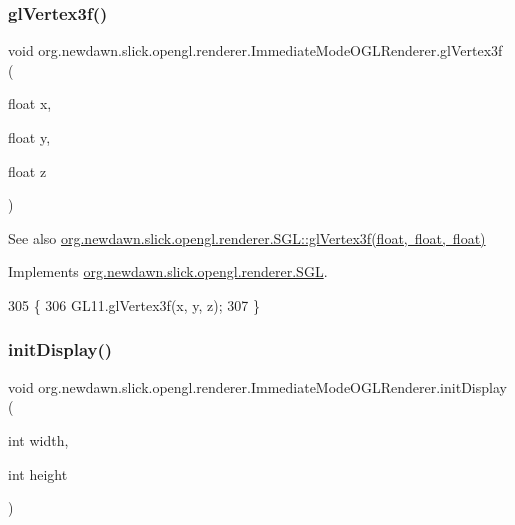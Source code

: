 \subsubsection{\texorpdfstring{gl\+Vertex3f()}{glVertex3f()}}
{\footnotesize\ttfamily void org.\+newdawn.\+slick.\+opengl.\+renderer.\+Immediate\+Mode\+O\+G\+L\+Renderer.\+gl\+Vertex3f (\begin{DoxyParamCaption}\item[{float}]{x,  }\item[{float}]{y,  }\item[{float}]{z }\end{DoxyParamCaption})\hspace{0.3cm}{\ttfamily [inline]}}

\begin{DoxySeeAlso}{See also}
\mbox{\hyperlink{interfaceorg_1_1newdawn_1_1slick_1_1opengl_1_1renderer_1_1_s_g_l_ae2baba1598d723f9059f45e0871be822}{org.\+newdawn.\+slick.\+opengl.\+renderer.\+S\+G\+L\+::gl\+Vertex3f(float, float, float)}} 
\end{DoxySeeAlso}


Implements \mbox{\hyperlink{interfaceorg_1_1newdawn_1_1slick_1_1opengl_1_1renderer_1_1_s_g_l_ae2baba1598d723f9059f45e0871be822}{org.\+newdawn.\+slick.\+opengl.\+renderer.\+S\+GL}}.


\begin{DoxyCode}
305                                                       \{
306         GL11.glVertex3f(x, y, z);
307     \}
\end{DoxyCode}
\mbox{\label{classorg_1_1newdawn_1_1slick_1_1opengl_1_1renderer_1_1_immediate_mode_o_g_l_renderer_a05e00bbbf5384585fa1d7c34c8932c6f}} 
\subsubsection{\texorpdfstring{init\+Display()}{initDisplay()}}
{\footnotesize\ttfamily void org.\+newdawn.\+slick.\+opengl.\+renderer.\+Immediate\+Mode\+O\+G\+L\+Renderer.\+init\+Display (\begin{DoxyParamCaption}\item[{int}]{width,  }\item[{int}]{height }\end{DoxyParamCaption})\hspace{0.3cm}{\ttfamily [inline]}}

